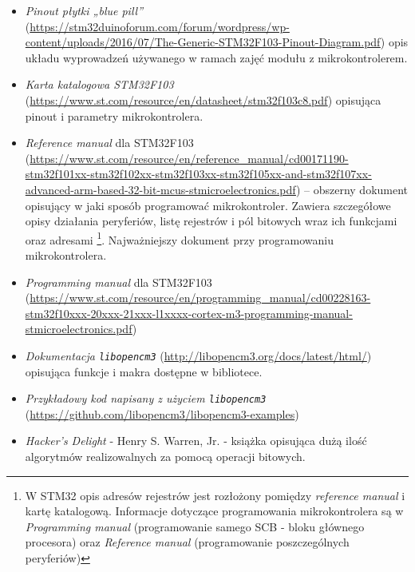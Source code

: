 \begin{itemize}
\item \emph{Pinout płytki „blue pill”} (\url{https://stm32duinoforum.com/forum/wordpress/wp-content/uploads/2016/07/The-Generic-STM32F103-Pinout-Diagram.pdf}) opis układu wyprowadzeń używanego w ramach zajęć modułu z mikrokontrolerem.

\item \emph{Karta katalogowa STM32F103} (\url{https://www.st.com/resource/en/datasheet/stm32f103c8.pdf}) opisująca pinout i parametry mikrokontrolera.
\item \emph{Reference manual} dla STM32F103 \label{refman}
	(\url{https://www.st.com/resource/en/reference_manual/cd00171190-stm32f101xx-stm32f102xx-stm32f103xx-stm32f105xx-and-stm32f107xx-advanced-arm-based-32-bit-mcus-stmicroelectronics.pdf})
	– obszerny dokument opisujący w jaki sposób programować  mikrokontroler.
	Zawiera szczegółowe opisy działania peryferiów, listę rejestrów i pól bitowych wraz ich funkcjami oraz  adresami
	\footnote{%
		W STM32 opis adresów rejestrów jest rozłożony pomiędzy \textit{reference manual} i kartę katalogową. Informacje dotyczące
		programowania mikrokontrolera są w \textit{Programming manual} (programowanie samego SCB - bloku głównego procesora) oraz
		\textit{Reference manual} (programowanie poszczególnych peryferiów)
	}.
	Najważniejszy dokument przy programowaniu mikrokontrolera.
\item \emph{Programming manual} dla STM32F103
	(\url{https://www.st.com/resource/en/programming_manual/cd00228163-stm32f10xxx-20xxx-21xxx-l1xxxx-cortex-m3-programming-manual-stmicroelectronics.pdf})

\item \emph{Dokumentacja \Verb$libopencm3$} (\url{http://libopencm3.org/docs/latest/html/}) opisująca funkcje i makra dostępne w bibliotece.
\item \emph{Przykładowy kod napisany z użyciem \Verb$libopencm3$}\\ (\url{https://github.com/libopencm3/libopencm3-examples}) 

\item \emph{Hacker's Delight} - Henry S. Warren, Jr. - książka opisująca dużą ilość algorytmów realizowalnych za pomocą operacji bitowych.
\end{itemize}
